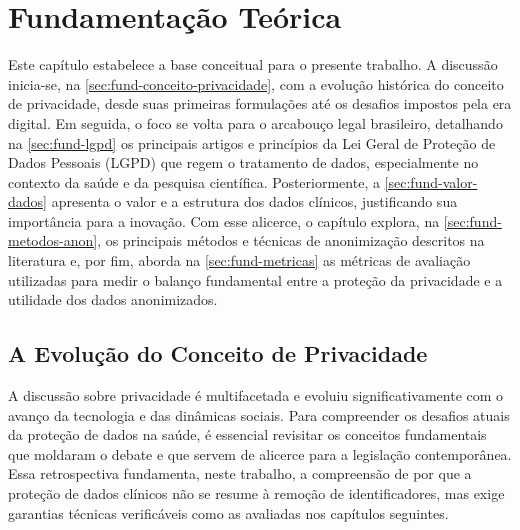 
\chapter{Fundamentação Teórica}
\label{ch:fundamentacao-teorica}


Este capítulo estabelece a base conceitual para o presente trabalho. A discussão inicia-se, na \autoref{sec:fund-conceito-privacidade}, com a evolução histórica do conceito de privacidade, desde suas primeiras formulações até os desafios impostos pela era digital. Em seguida, o foco se volta para o arcabouço legal brasileiro, detalhando na \autoref{sec:fund-lgpd} os principais artigos e princípios da Lei Geral de Proteção de Dados Pessoais (LGPD) que regem o tratamento de dados, especialmente no contexto da saúde e da pesquisa científica. Posteriormente, a \autoref{sec:fund-valor-dados} apresenta o valor e a estrutura dos dados clínicos, justificando sua importância para a inovação. Com esse alicerce, o capítulo explora, na \autoref{sec:fund-metodos-anon}, os principais métodos e técnicas de anonimização descritos na literatura e, por fim, aborda na \autoref{sec:fund-metricas} as métricas de avaliação utilizadas para medir o balanço fundamental entre a proteção da privacidade e a utilidade dos dados anonimizados.
\section{A Evolução do Conceito de Privacidade}
\label{sec:fund-conceito-privacidade}

A discussão sobre privacidade é multifacetada e evoluiu significativamente com o avanço da tecnologia e das dinâmicas sociais. Para compreender os desafios atuais da proteção de dados na saúde, é essencial revisitar os conceitos fundamentais que moldaram o debate e que servem de alicerce para a legislação contemporânea. Essa retrospectiva fundamenta, neste trabalho, a compreensão de por que a proteção de dados clínicos não se resume à remoção de identificadores, mas exige garantias técnicas verificáveis como as avaliadas nos capítulos seguintes.

